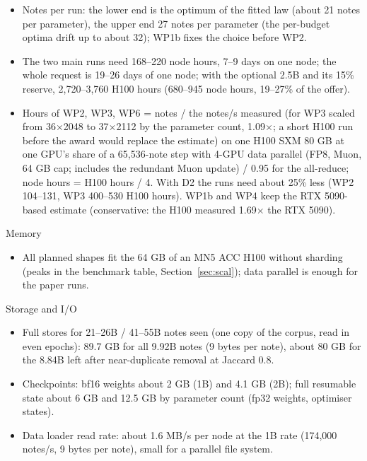 \documentclass[11pt,a4paper]{article}
\makeatletter
\renewcommand\subsection{\@startsection{subsection}{2}{\z@}{-2.6ex \@plus -1ex \@minus -.2ex}{1.2ex \@plus .2ex}%
  {\normalfont\large\bfseries\color{head}}}
\makeatother
\begin{document}
\begin{itemize}
\item Notes per run: the lower end is the optimum of the fitted law (about 21 notes per parameter), the upper end
27 notes per parameter (the per-budget optima drift up to about 32); WP1b fixes the choice before WP2.
\item The two main runs need 168--220 node hours, 7--9 days on one node; the whole request is 19--26 days of one
node; with the optional 2.5B and its 15\% reserve, 2,720--3,760 H100 hours (680--945 node hours, 19--27\% of the offer).
\item Hours of WP2, WP3, WP6 = notes / the notes/s measured (for WP3 scaled from 36$\times$2048 to 37$\times$2112 by the
parameter count, 1.09$\times$; a short H100 run before the award would replace the estimate) on one H100 SXM 80 GB at one GPU's share of a 65,536-note
step with 4-GPU data parallel (FP8, Muon, 64 GB cap; includes the redundant Muon update) / 0.95 for the all-reduce;
node hours = H100 hours / 4. With D2 the runs need about 25\% less (WP2 104--131, WP3 400--530 H100 hours). WP1b
and WP4 keep the RTX 5090-based estimate (conservative: the H100 measured 1.69$\times$ the RTX 5090).
\end{itemize}

\subsection{Memory}
\begin{itemize}
\item All planned shapes fit the 64 GB of an MN5 ACC H100 without sharding (peaks in the benchmark table,
Section~\ref{sec:scal}); data parallel is enough for the paper runs.
\end{itemize}

\subsection{Storage and I/O}
\begin{itemize}
\item Full stores for 21--26B / 41--55B notes seen (one copy of the corpus, read in even epochs): 89.7 GB for all
9.92B notes (9 bytes per note), about 80 GB for the 8.84B left after near-duplicate removal at Jaccard 0.8.
\item Checkpoints: bf16 weights about 2 GB (1B) and 4.1 GB (2B); full resumable state about 6 GB and 12.5 GB by
parameter count (fp32 weights, optimiser states).
\item Data loader read rate: about 1.6 MB/s per node at the 1B rate (174,000 notes/s, 9 bytes per note), small for a
parallel file system.
\end{itemize}
\end{document}
